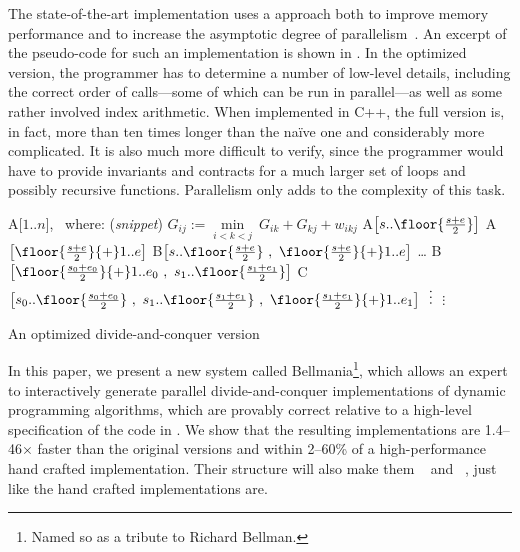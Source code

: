 The state-of-the-art implementation uses a  approach both to improve memory performance and to increase the asymptotic degree of parallelism~\cite{IPDPS15/Tithi}. An excerpt of the pseudo-code for such an implementation is shown in . In the optimized version, the programmer has to determine a number of low-level details, including the correct order of calls---some of which can be run in parallel---as well as some rather involved index arithmetic. When implemented in C++, the full version is, in fact, more than ten times longer than the na\"ive one and considerably more complicated. It is also much more difficult to verify, since the programmer would have to provide invariants and contracts for a much larger set of loops and possibly recursive functions. Parallelism only adds to the complexity of this task.



\begin{algorithm}[b!]
\fontsize{9}{10}   %
\begin{algorithmic}
  \State A[$1..n$], ~where: \hfill{\normalsize (\textit{snippet})}
	      \State $G_{ij} := \underset{i<k<j}\min ~ G_{ik} + G_{kj} + w_{ikj}$
	    \EndFor
	  \EndFor
    \vspace{-5pt}
	\Else
	  \State A$\big[ s..\floor{\frac{s+e}{2}} \big]$
	  \State A$\big[ \floor{\frac{s+e}{2}}{+}1..e \big]$
	  \State B$\big[ s..\floor{\frac{s+e}{2}} ~,~ \floor{\frac{s+e}{2}}{+}1..e \big]$
	\EndIf
  \EndProcedure
	 \ldots
	\Else
	  \State B$\big[ \floor{\frac{s_0+e_0}{2}}{+}1..e_0 ~,~ s_1..\floor{\frac{s_1+e_1}{2}} \big]$
	  \State C$\big[ s_0..\floor{\frac{s_0+e_0}{2}} ~,~ s_1..\floor{\frac{s_1+e_1}{2}} ~,~ \floor{\frac{s_1+e_1}{2}}{+}1..e_1 \big]$
	  \vspace{-5pt}
	  \State $\vdotswithin{C}$
	\EndIf
  \EndProcedure
    \vspace{-5pt}
    \State $\vdots$
  \EndProcedure
\end{algorithmic}
\caption{\label{intro:divide-and-conquer}
   An optimized divide-and-conquer version}
\end{algorithm}




In this paper, we present a new system called Bellmania\footnote{Named so as a tribute to Richard Bellman.}, which allows an expert to interactively generate parallel divide-and-conquer implementations of dynamic programming algorithms, which are provably correct relative to a high-level specification of the code in . We show that the resulting implementations are \cbstart{}1.4--46$\times$ faster than the original versions and within 2--60\%\cbend{} of a high-performance hand crafted implementation.
Their structure will also make them ~\cite{FOCS99/Frigo} and ~\cite{SODA14/Bender}, just like the hand crafted implementations are.


